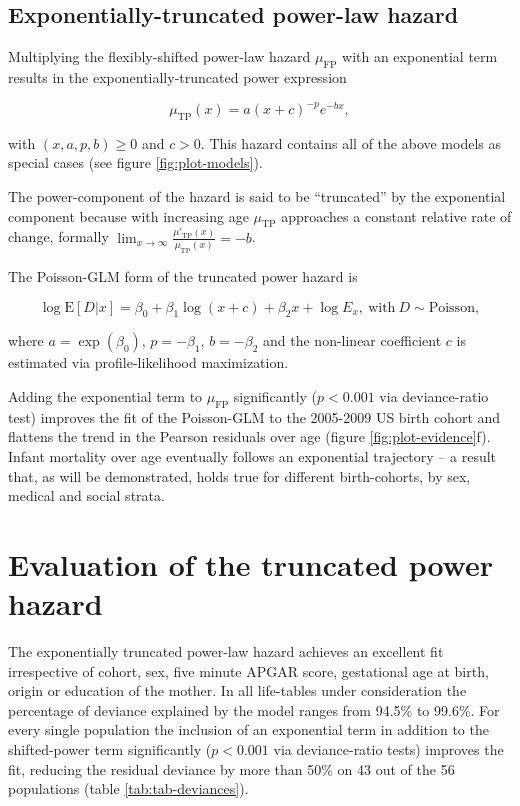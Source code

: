 \documentclass[smallextended]{svjour3} %
\begin{document}
\subsection*{Exponentially-truncated power-law
hazard}\label{exponentially-truncated-power-law-hazard}

Multiplying the flexibly-shifted power-law hazard \(\mu_\text{FP}\) with
an exponential term results in the exponentially-truncated power
expression

\[
\mu_\text{TP}(x) = a(x+c)^{-p}e^{-bx},
\]

with \((x, a, p, b)\geq 0\) and \(c>0\). This hazard contains all of the
above models as special cases (see figure \ref{fig:plot-models}).

The power-component of the hazard is said to be ``truncated'' by the
exponential component because with increasing age \(\mu_\text{TP}\)
approaches a constant relative rate of change, formally
\(\lim_{x\to\infty}\frac{\mu'_\text{TP}(x)}{\mu_\text{TP}(x)}=-b\).

The Poisson-GLM form of the truncated power hazard is

\[
\log\text{E}[D|x] = \beta_0 + \beta_1\log(x+c) + \beta_2x+\log E_x,~\text{with}~D\sim\text{Poisson},
\]

where \(a = \exp(\beta_0)\), \(p = -\beta_1\), \(b = -\beta_2\) and the
non-linear coefficient \(c\) is estimated via profile-likelihood
maximization.

Adding the exponential term to \(\mu_\text{FP}\) significantly
(\(p<0.001\) via deviance-ratio test) improves the fit of the
Poisson-GLM to the 2005-2009 US birth cohort and flattens the trend in
the Pearson residuals over age (figure \ref{fig:plot-evidence}f). Infant
mortality over age eventually follows an exponential trajectory -- a
result that, as will be demonstrated, holds true for different
birth-cohorts, by sex, medical and social strata.

\section*{Evaluation of the truncated power
hazard}\label{evaluation-of-the-truncated-power-hazard}

The exponentially truncated power-law hazard achieves an excellent fit
irrespective of cohort, sex, five minute APGAR score, gestational age at
birth, origin or education of the mother. In all life-tables under
consideration the percentage of deviance explained by the model ranges
from 94.5\% to 99.6\%. For every single population the inclusion of an
exponential term in addition to the shifted-power term significantly
(\(p<0.001\) via deviance-ratio tests) improves the fit, reducing the
residual deviance by more than 50\% on 43 out of the 56 populations
(table \ref{tab:tab-deviances}).
\end{document}
